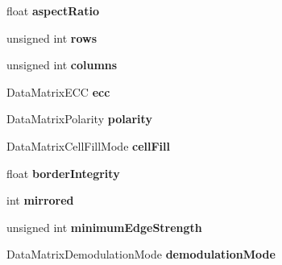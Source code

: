 \begin{DoxyCompactItemize}
\item 
\hypertarget{structDataMatrixReport__struct_a8cd14370c454a773054d1a69ee977d00}{
float {\bfseries aspectRatio}}
\label{structDataMatrixReport__struct_a8cd14370c454a773054d1a69ee977d00}

\item 
\hypertarget{structDataMatrixReport__struct_a2505df96b14f569f052534b3c0cf7265}{
unsigned int {\bfseries rows}}
\label{structDataMatrixReport__struct_a2505df96b14f569f052534b3c0cf7265}

\item 
\hypertarget{structDataMatrixReport__struct_a01d1eade1620ee10437dfbaef3706880}{
unsigned int {\bfseries columns}}
\label{structDataMatrixReport__struct_a01d1eade1620ee10437dfbaef3706880}

\item 
\hypertarget{structDataMatrixReport__struct_aa481777742b099796cc8c4d2e5326738}{
DataMatrixECC {\bfseries ecc}}
\label{structDataMatrixReport__struct_aa481777742b099796cc8c4d2e5326738}

\item 
\hypertarget{structDataMatrixReport__struct_a97cc5dc819721b7126dbd2709a754af7}{
DataMatrixPolarity {\bfseries polarity}}
\label{structDataMatrixReport__struct_a97cc5dc819721b7126dbd2709a754af7}

\item 
\hypertarget{structDataMatrixReport__struct_a5e71d3f51bf02da4224eba502ffa2395}{
DataMatrixCellFillMode {\bfseries cellFill}}
\label{structDataMatrixReport__struct_a5e71d3f51bf02da4224eba502ffa2395}

\item 
\hypertarget{structDataMatrixReport__struct_a369902b5e6013b0b8d0fee58f545ec18}{
float {\bfseries borderIntegrity}}
\label{structDataMatrixReport__struct_a369902b5e6013b0b8d0fee58f545ec18}

\item 
\hypertarget{structDataMatrixReport__struct_af087371d89d8932b744cfaeb2d659a6c}{
int {\bfseries mirrored}}
\label{structDataMatrixReport__struct_af087371d89d8932b744cfaeb2d659a6c}

\item 
\hypertarget{structDataMatrixReport__struct_aed6d8e91a32785cf3eac6ebe13c0cbf9}{
unsigned int {\bfseries minimumEdgeStrength}}
\label{structDataMatrixReport__struct_aed6d8e91a32785cf3eac6ebe13c0cbf9}

\item 
\hypertarget{structDataMatrixReport__struct_afd798f570cca5bde66948f3bec9fcec0}{
DataMatrixDemodulationMode {\bfseries demodulationMode}}
\label{structDataMatrixReport__struct_afd798f570cca5bde66948f3bec9fcec0}


\end{DoxyCompactItemize}
